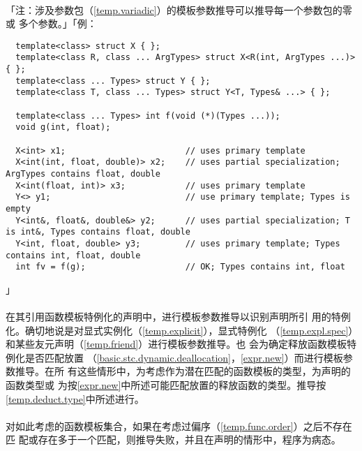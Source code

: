 \paragraph{}
「注：涉及参数包（\ref{temp.variadic}）的模板参数推导可以推导每一个参数包的零或
多个参数。」「例：
\begin{lstlisting}
  template<class> struct X { };
  template<class R, class ... ArgTypes> struct X<R(int, ArgTypes ...)> { };
  template<class ... Types> struct Y { };
  template<class T, class ... Types> struct Y<T, Types& ...> { };

  template<class ... Types> int f(void (*)(Types ...));
  void g(int, float);

  X<int> x1;                        // uses primary template
  X<int(int, float, double)> x2;    // uses partial specialization; ArgTypes contains float, double
  X<int(float, int)> x3;            // uses primary template
  Y<> y1;                           // use primary template; Types is empty
  Y<int&, float&, double&> y2;      // uses partial specialization; T is int&, Types contains float, double
  Y<int, float, double> y3;         // uses primary template; Types contains int, float, double
  int fv = f(g);                    // OK; Types contains int, float
\end{lstlisting}」

\paragraph{}
在其引用函数模板特例化的声明中，进行模板参数推导以识别声明所引
用的特例化。确切地说是对显式实例化（\ref{temp.explicit}），显式特例化
（\ref{temp.expl.spec}）和某些友元声明（\ref{temp.friend}）进行模板参数推导。也
会为确定释放函数模板特例化是否匹配放置
（\ref{basic.stc.dynamic.deallocation}，\ref{expr.new}）而进行模板参数推导。在所
有这些情形中，为考虑作为潜在匹配的函数模板的类型，为声明的函数类型或
为按\ref{expr.new}中所述可能匹配放置的释放函数的类型。推导按
\ref{temp.deduct.type}中所述进行。

\paragraph{}
对如此考虑的函数模板集合，如果在考虑过偏序（\ref{temp.func.order}）之后不存在匹
配或存在多于一个匹配，则推导失败，并且在声明的情形中，程序为病态。

